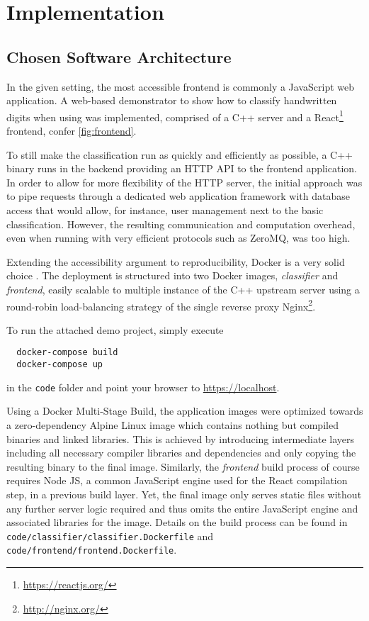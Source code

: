 \chapter{Implementation}
\label{chap:implementation}

\section{Chosen Software Architecture}
In the given setting, the most accessible frontend is commonly a JavaScript web application.
A web-based demonstrator to show how to classify handwritten digits when using  was implemented, comprised of a C++ server and a React\footnote{\url{https://reactjs.org/}} frontend, confer \cref{fig:frontend}.

To still make the classification run as quickly and efficiently as possible, a C++ binary runs in the backend providing an HTTP API to the frontend application.
In order to allow for more flexibility of the HTTP server, the initial approach was to pipe requests through a dedicated web application framework with database access that would allow, for instance, user management next to the basic classification.
However, the resulting communication and computation overhead, even when running with very efficient protocols such as ZeroMQ, was too high.

Extending the accessibility argument to reproducibility, Docker is a very solid choice \parencite{using-docker-in-science}.
The deployment is structured into two Docker images, \textit{classifier} and \textit{frontend}, easily scalable to multiple instance of the C++ upstream server using a round-robin load-balancing strategy of the single reverse proxy Nginx\footnote{\url{http://nginx.org/}}.

To run the attached demo project, simply execute
\begin{verbatim}
  docker-compose build
  docker-compose up
\end{verbatim}
in the \texttt{code} folder and point your browser to \url{https://localhost}.

Using a Docker Multi-Stage Build, the application images were optimized towards a zero-dependency Alpine Linux image which contains nothing but compiled binaries and linked libraries.
This is achieved by introducing intermediate layers including all necessary compiler libraries and dependencies and only copying the resulting binary to the final image.
Similarly, the \textit{frontend} build process of course requires Node JS, a common JavaScript engine used for the React compilation step, in a previous build layer.
Yet, the final image only serves static files without any further server logic required and thus omits the entire JavaScript engine and associated libraries for the image.
Details on the build process can be found in \texttt{code/classifier/classifier.Dockerfile} and \texttt{code/frontend/frontend.Dockerfile}.

